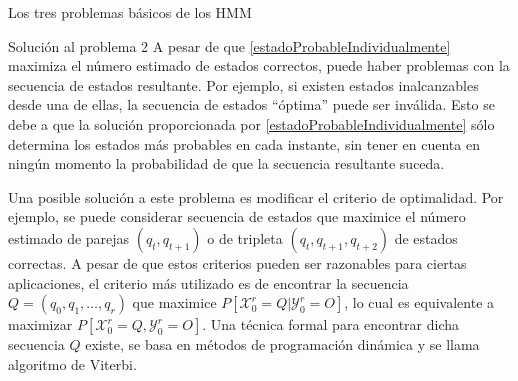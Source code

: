 \begin{section}{Los tres problemas básicos de los HMM}
\begin{subsection}{Solución al problema 2}
A pesar de que \eqref{estadoProbableIndividualmente} maximiza el número estimado de estados correctos, puede haber problemas con la secuencia de estados resultante. Por ejemplo, si existen estados inalcanzables desde una de ellas, la secuencia de estados \enquote{óptima} puede ser inválida. Esto se debe a que la solución proporcionada por \eqref{estadoProbableIndividualmente} sólo determina los estados más probables en cada instante, sin tener en cuenta en ningún momento la probabilidad de que la secuencia resultante suceda. 

Una posible solución a este problema es modificar el criterio de optimalidad. Por ejemplo, se puede considerar secuencia de estados que maximice el número estimado de parejas $(q_t,q_{t+1})$ o de tripleta $(q_t,q_{t+1},q_{t+2})$ de estados correctas. A pesar de que estos criterios pueden ser razonables para ciertas aplicaciones, el criterio más utilizado es de encontrar la secuencia $Q=(q_0, q_1, \dots, q_r)$ que maximice $P[\mathcal{X}_0^r=Q|\mathcal{Y}_0^r=O]$, lo cual es equivalente a maximizar $P[\mathcal{X}_0^r=Q,\mathcal{Y}_0^r=O]$. Una técnica formal para encontrar dicha secuencia $Q$ existe, se basa en métodos de programación dinámica y se llama algoritmo de Viterbi.




\end{subsection}

\end{section}